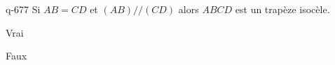 \begin{truefalse}{q-677}
Si $AB=CD$ et $(AB)//(CD)$ alors $ABCD$ est un trapèze isocèle.
\item Vrai
\item* Faux
\end{truefalse}


